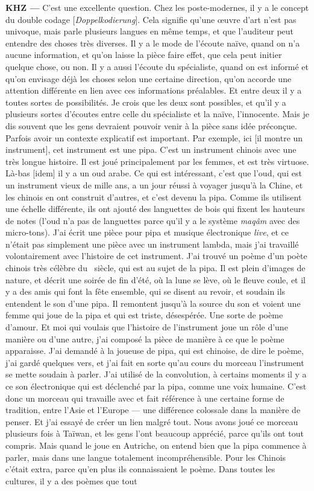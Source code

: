\documentclass[a4paper,12pt]{article}
\begin{document}
\textbf{KHZ ---} C'est une excellente question. Chez les poste-modernes, il y a le concept du double codage [\emph{Doppelkodierung}]. Cela signifie qu'une œuvre d'art n'est pas univoque, mais parle plusieurs langues en même temps, et que l'auditeur peut entendre des choses très diverses. Il y a le mode de l'écoute naïve, quand on n'a aucune information, et qu'on laisse la pièce faire effet, que cela peut initier quelque chose, ou non. Il y a aussi l'écoute du spécialiste, quand on est informé et qu'on envisage déjà les choses selon une certaine direction, qu'on accorde une attention différente en lien avec ces informations préalables. Et entre deux il y a toutes sortes de possibilités. Je crois que les deux sont possibles, et qu'il y a plusieurs sortes d'écoutes entre celle du spécialiste et la naïve, l'innocente. Mais je dis souvent que les gens devraient pouvoir venir à la pièce sans idée préconçue. Parfois avoir un contexte explicatif est important. Par exemple, ici [il montre un instrument], cet instrument est une pipa. C'est un instrument chinois avec une très longue histoire. Il est joué principalement par les femmes, et est très virtuose. Là-bas [idem] il y a un oud arabe. Ce qui est intéressant, c'est que l'oud, qui est un instrument vieux de mille ans, a un jour réussi à voyager jusqu'à la Chine, et les chinois en ont construit d'autres, et c'est devenu la pipa. Comme ils utilisent une échelle différente, ils ont ajouté des languettes de bois qui fixent les hauteurs de notes (l'oud n'a pas de languettes parce qu'il y a le système \emph{maqâm} avec des micro-tons). J'ai écrit une pièce pour pipa et musique électronique \emph{live}, et ce n'était pas simplement une pièce avec un instrument lambda, mais j'ai travaillé volontairement avec l'histoire de cet instrument. J'ai trouvé un poème d'un poète chinois très célèbre du \VIIIe~siècle, qui est au sujet de la pipa. Il est plein d'images de nature, et décrit une soirée de fin d'été, où la lune se lève, où le fleuve coule, et il y a des amis qui font la fête ensemble, qui se disent au revoir, et soudain ils entendent le son d'une pipa. Il remontent jusqu'à la source du son et voient une femme qui joue de la pipa et qui est triste, désespérée. Une sorte de poème d'amour. Et moi qui voulais que l'histoire de l'instrument joue un rôle d'une manière ou d'une autre, j'ai composé la pièce de manière à ce que le poème apparaisse. J'ai demandé à la joueuse de pipa, qui est chinoise, de dire le poème, j'ai gardé quelques vers, et j'ai fait en sorte qu'au cours du morceau l'instrument se mette soudain à parler. J'ai utilisé de la convolution, à certains moments il y a ce son électronique qui est déclenché par la pipa, comme une voix humaine. C'est donc un morceau qui travaille avec et fait référence à une certaine forme de tradition, entre l'Asie et l'Europe --- une différence colossale dans la manière de penser. Et j'ai essayé de créer un lien malgré tout. Nous avons joué ce morceau plusieurs fois à Taïwan, et les gens l'ont beaucoup apprécié, parce qu'ils ont tout compris. Mais quand le joue en Autriche, on entend bien que la pipa commence à parler, mais dans une langue totalement incompréhensible. Pour les Chinois c'était extra, parce qu'en plus ils connaissaient le poème. Dans toutes les cultures, il y a des poèmes que tout 
\end{document}
